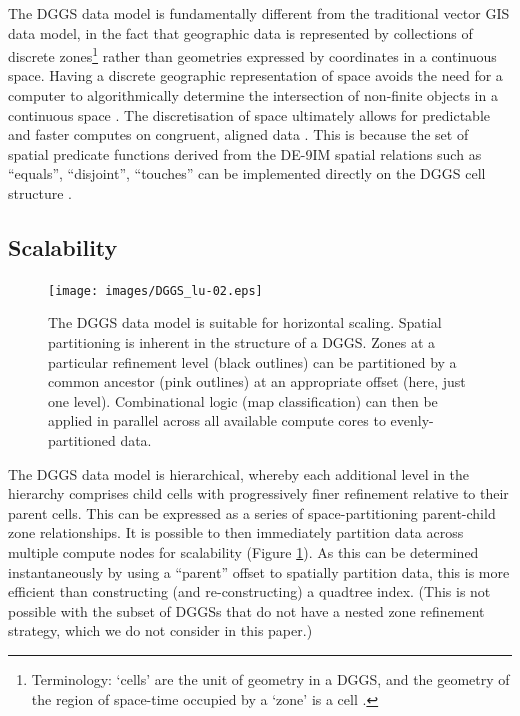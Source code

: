 \documentclass[]{interact}
\theoremstyle{plain}%
\theoremstyle{definition}
\theoremstyle{remark}
\begin{document}
The \ac{DGGS} data model is fundamentally different from the traditional vector \ac{GIS} data model, in the fact that geographic data is represented by collections of discrete zones\footnote{Terminology: `cells' are the unit of geometry in a \ac{DGGS}, and the geometry of the region of space-time occupied by a `zone' is a cell \citep{topic21}.} rather than geometries expressed by coordinates in a continuous space. Having a discrete geographic representation of space avoids the need for a computer to algorithmically determine the intersection of non-finite objects in a continuous space \citep{bentley1979algorithms,robertson2020integrated}. The discretisation of space ultimately allows for predictable and faster computes on congruent, aligned data \citep{dutton1989modelling}. This is because the set of spatial predicate functions derived from the \ac{DE-9IM} spatial relations such as ``equals'', ``disjoint'', ``touches'' can be implemented directly on the \ac{DGGS} cell structure \citep{clementini1994modelling,topic21}.

\subsection{Scalability}

\begin{figure}[t]
    \centering
    \texttt{[image: images/DGGS\_lu-02.eps]}
    \caption{The \ac{DGGS} data model is suitable for horizontal scaling. Spatial partitioning is inherent in the structure of a \ac{DGGS}. Zones at a particular refinement level (black outlines) can be partitioned by a common ancestor (pink outlines) at an appropriate offset (here, just one level). Combinational logic (map classification) can then be applied in parallel across all available compute cores to evenly-partitioned data.}
    \label{fig:Scalable}
\end{figure}

The \ac{DGGS} data model is hierarchical, whereby each additional level in the hierarchy comprises child cells with progressively finer refinement relative to their parent cells. This can be expressed as a series of space-partitioning parent-child zone relationships. It is possible to then immediately partition data across multiple compute nodes for scalability (Figure \ref{fig:Scalable}). As this can be determined instantaneously by using a ``parent'' offset to spatially partition data, this is more efficient than constructing (and re-constructing) a quadtree index. (This is not possible with the subset of \acp{DGGS} that do not have a nested zone refinement strategy, which we do not consider in this paper.)
\end{document}
